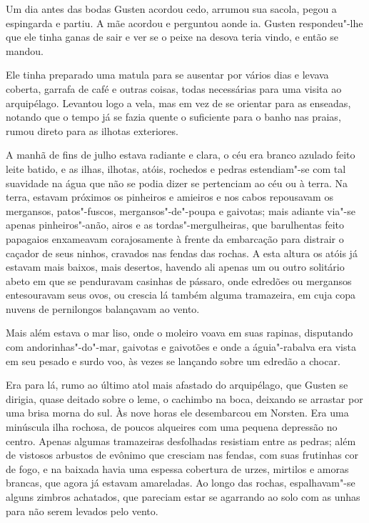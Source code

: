  Um dia antes das bodas  Gusten acordou cedo, arrumou sua sacola, pegou a espingarda e
 partiu. A mãe acordou e perguntou aonde ia. Gusten respondeu"-lhe que ele
 tinha ganas de sair e ver se o peixe na desova teria vindo, e então se mandou.
 
 Ele tinha preparado uma matula para se ausentar por vários dias e levava
 coberta, garrafa de café e outras coisas, todas necessárias para uma visita ao
 arquipélago. Levantou logo a vela, mas em vez de se orientar para as
 enseadas, notando que o tempo já se fazia quente o suficiente para o banho nas
 praias, rumou direto para as ilhotas exteriores. 
 
 A manhã de fins de julho  estava radiante e clara, o céu era branco azulado feito 
 leite batido, e as  ilhas, ilhotas, atóis, rochedos e pedras estendiam"-se com tal suavidade na
 água que não se podia dizer se pertenciam ao céu ou à terra. Na terra, estavam
 próximos os pinheiros e amieiros e nos cabos repousavam os mergansos,
 patos"-fuscos, mergansos"-de"-poupa e gaivotas; mais adiante via"-se apenas
 pinheiros"-anão, airos e as tordas"-mergulheiras, que barulhentas feito
 papagaios enxameavam corajosamente à frente da embarcação para distrair o
 caçador de seus ninhos, cravados nas fendas das rochas. A esta altura os atóis
 já estavam mais baixos, mais desertos, havendo ali apenas um ou outro solitário
 abeto em que se penduravam casinhas de pássaro, onde edredões ou mergansos
 entesouravam seus ovos, ou crescia lá também alguma tramazeira, em cuja copa
 nuvens de pernilongos balançavam ao vento. 
 
 Mais além estava o mar liso, onde o
 moleiro voava em suas rapinas, disputando com andorinhas"-do"-mar, gaivotas e
 gaivotões e onde a águia"-rabalva era vista em seu pesado e surdo voo, às vezes
 se lançando sobre um edredão a chocar. 
 
 Era para lá, rumo ao último atol mais afastado do arquipélago, que Gusten 
 se dirigia, quase deitado sobre o leme, o cachimbo na boca, deixando se
 arrastar por uma brisa morna do sul. Às nove horas ele desembarcou em Norsten.
 Era uma minúscula ilha rochosa, de poucos alqueires com uma pequena
 depressão no centro. Apenas algumas tramazeiras desfolhadas resistiam entre as
 pedras; além de vistosos arbustos de evônimo que cresciam nas fendas, com suas
 frutinhas cor de fogo, e na baixada havia uma espessa cobertura de urzes,
 mirtilos e amoras brancas, que agora já estavam amareladas. Ao longo das
 rochas, espalhavam"-se alguns zimbros achatados, que pareciam estar se agarrando
 ao solo com as unhas para não serem levados pelo vento. 
 
